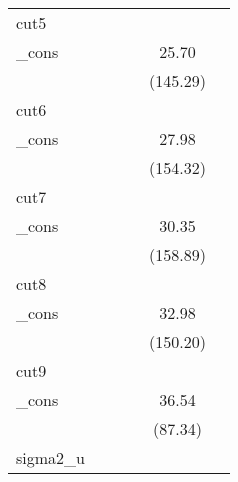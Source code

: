 {\begin{tabular}{l*{5}{c}}
\hline
cut5        &                     &                     &                     &                     &                     \\
\_cons      &                     &                     &                     &       25.70\sym{***}&                     \\
            &                     &                     &                     &    (145.29)         &                     \\
\hline
cut6        &                     &                     &                     &                     &                     \\
\_cons      &                     &                     &                     &       27.98\sym{***}&                     \\
            &                     &                     &                     &    (154.32)         &                     \\
\hline
cut7        &                     &                     &                     &                     &                     \\
\_cons      &                     &                     &                     &       30.35\sym{***}&                     \\
            &                     &                     &                     &    (158.89)         &                     \\
\hline
cut8        &                     &                     &                     &                     &                     \\
\_cons      &                     &                     &                     &       32.98\sym{***}&                     \\
            &                     &                     &                     &    (150.20)         &                     \\
\hline
cut9        &                     &                     &                     &                     &                     \\
\_cons      &                     &                     &                     &       36.54\sym{***}&                     \\
            &                     &                     &                     &     (87.34)         &                     \\
\hline
sigma2\_u    &                     &                     &                     &                     &                     \\

\end{tabular}}
